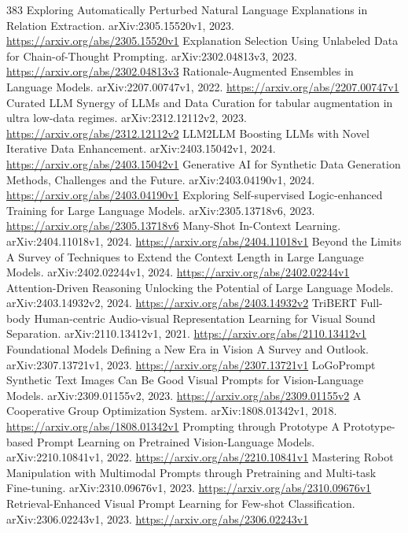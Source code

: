 \documentclass[11pt]{article}
\begin{document}
\begin{thebibliography}{383}
 Exploring Automatically Perturbed Natural Language Explanations in Relation Extraction. arXiv:2305.15520v1, 2023. \url{https://arxiv.org/abs/2305.15520v1}
 Explanation Selection Using Unlabeled Data for Chain-of-Thought Prompting. arXiv:2302.04813v3, 2023. \url{https://arxiv.org/abs/2302.04813v3}
 Rationale-Augmented Ensembles in Language Models. arXiv:2207.00747v1, 2022. \url{https://arxiv.org/abs/2207.00747v1}
 Curated LLM Synergy of LLMs and Data Curation for tabular augmentation in ultra low-data regimes. arXiv:2312.12112v2, 2023. \url{https://arxiv.org/abs/2312.12112v2}
 LLM2LLM Boosting LLMs with Novel Iterative Data Enhancement. arXiv:2403.15042v1, 2024. \url{https://arxiv.org/abs/2403.15042v1}
 Generative AI for Synthetic Data Generation Methods, Challenges and the Future. arXiv:2403.04190v1, 2024. \url{https://arxiv.org/abs/2403.04190v1}
 Exploring Self-supervised Logic-enhanced Training for Large Language Models. arXiv:2305.13718v6, 2023. \url{https://arxiv.org/abs/2305.13718v6}
 Many-Shot In-Context Learning. arXiv:2404.11018v1, 2024. \url{https://arxiv.org/abs/2404.11018v1}
 Beyond the Limits A Survey of Techniques to Extend the Context Length in Large Language Models. arXiv:2402.02244v1, 2024. \url{https://arxiv.org/abs/2402.02244v1}
 Attention-Driven Reasoning Unlocking the Potential of Large Language Models. arXiv:2403.14932v2, 2024. \url{https://arxiv.org/abs/2403.14932v2}
 TriBERT Full-body Human-centric Audio-visual Representation Learning for Visual Sound Separation. arXiv:2110.13412v1, 2021. \url{https://arxiv.org/abs/2110.13412v1}
 Foundational Models Defining a New Era in Vision A Survey and Outlook. arXiv:2307.13721v1, 2023. \url{https://arxiv.org/abs/2307.13721v1}
 LoGoPrompt Synthetic Text Images Can Be Good Visual Prompts for Vision-Language Models. arXiv:2309.01155v2, 2023. \url{https://arxiv.org/abs/2309.01155v2}
 A Cooperative Group Optimization System. arXiv:1808.01342v1, 2018. \url{https://arxiv.org/abs/1808.01342v1}
 Prompting through Prototype A Prototype-based Prompt Learning on Pretrained Vision-Language Models. arXiv:2210.10841v1, 2022. \url{https://arxiv.org/abs/2210.10841v1}
 Mastering Robot Manipulation with Multimodal Prompts through Pretraining and Multi-task Fine-tuning. arXiv:2310.09676v1, 2023. \url{https://arxiv.org/abs/2310.09676v1}
 Retrieval-Enhanced Visual Prompt Learning for Few-shot Classification. arXiv:2306.02243v1, 2023. \url{https://arxiv.org/abs/2306.02243v1}

\end{thebibliography}
\end{document}
